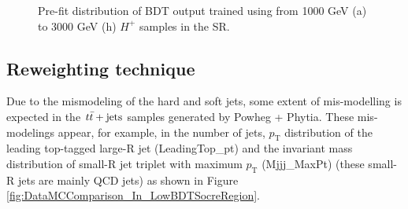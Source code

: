 \begin{figure}[H]
{        \label{fig:DataMCComparison_BDT_Hp2500_SR_beforeRW}
    }
    \caption{Pre-fit distribution of BDT output trained using from 1000 GeV (a) to 3000 GeV (h) $H^{+}$ samples in the SR.}
    \label{fig:DataMCComparison_BDT_beforeRW}
\end{figure}

\subsection{Reweighting technique}
\label{subsec:ReweightingTechnique}
Due to the mismodeling of the hard and soft jets, some extent of mis-modelling is expected in the $t\Bar{t}+\text{jets}$ samples generated by Powheg + Phytia. These mis-modelings appear, for example, in the number of jets, $p_\text{T}$ distribution of the leading top-tagged large-R jet (LeadingTop\_pt) and the invariant mass distribution of small-R jet triplet with maximum $p_{\text{T}}$ (Mjjj\_MaxPt) (these small-R jets are mainly QCD jets) as shown in Figure \ref{fig:DataMCComparison_In_LowBDTSocreRegion}.

